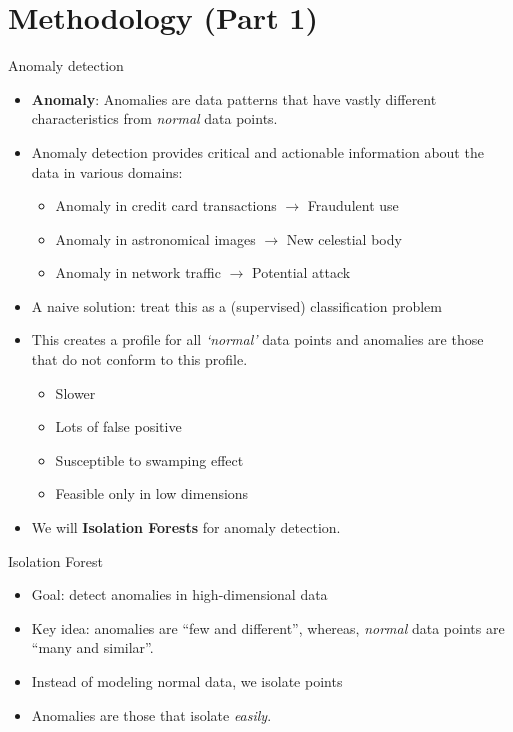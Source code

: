 \section{Methodology (Part 1)}

\begin{frame}{Anomaly detection}
\begin{itemize}
  \item \textbf{Anomaly}: Anomalies are data patterns that have vastly
    different characteristics from \textit{normal} data points.
    \item Anomaly detection provides critical and actionable
      information about the data in various domains:
      \begin{itemize}
        \item Anomaly in credit card transactions $\rightarrow$
          Fraudulent use
        \item Anomaly in astronomical images $\rightarrow$
          New celestial body
        \item Anomaly in network traffic $\rightarrow$
          Potential attack
      \end{itemize}
    \item A naive solution: treat this as a (supervised)
      classification problem
    \item This creates a profile for all \textit{`normal'} data points
      and anomalies are those that do not conform to this profile.
    \begin{itemize}
      \item Slower
      \item Lots of false positive
      \item Susceptible to swamping effect
      \item Feasible only in low dimensions
    \end{itemize}
  \item We will \textbf{Isolation Forests} for anomaly detection.
\end{itemize}
\end{frame}
\newpage

\begin{frame}{Isolation Forest}
\begin{itemize}
    \item Goal: detect anomalies in high-dimensional data
    \item Key idea: anomalies are ``few and different'',
      whereas, \textit{normal} data points are ``many and similar''.
    \item Instead of modeling normal data, we isolate points
    \item Anomalies are those that isolate \textit{easily}.
\end{itemize}
\end{frame}
\newpage

